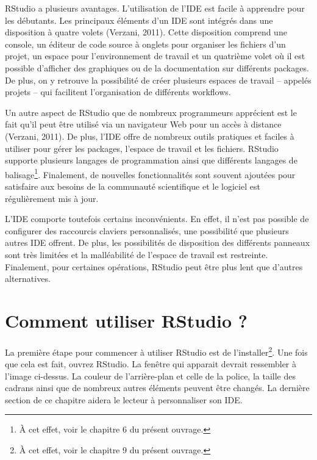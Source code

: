 \documentclass[
  letterpaper,
]{scrbook}
\begin{document}
RStudio a plusieurs avantages. L'utilisation de l'IDE est facile à
apprendre pour les débutants. Les principaux éléments d'un IDE sont
intégrés dans une disposition à quatre volets (Verzani, 2011). Cette
disposition comprend une console, un éditeur de code source à onglets
pour organiser les fichiers d'un projet, un espace pour l'environnement
de travail et un quatrième volet où il est possible d'afficher des
graphiques ou de la documentation sur différents packages. De plus, on y
retrouve la possibilité de créer plusieurs espaces de travail -- appelés
projets -- qui facilitent l'organisation de différents workflows.

Un autre aspect de RStudio que de nombreux programmeurs apprécient est
le fait qu'il peut être utilisé via un navigateur Web pour un accès à
distance (Verzani, 2011). De plus, l'IDE offre de nombreux outils
pratiques et faciles à utiliser pour gérer les packages, l'espace de
travail et les fichiers. RStudio supporte plusieurs langages de
programmation ainsi que différents langages de balisage\footnote{À cet
  effet, voir le chapitre 6 du présent ouvrage.}. Finalement, de
nouvelles fonctionnalités sont souvent ajoutées pour satisfaire aux
besoins de la communauté scientifique et le logiciel est régulièrement
mis à jour.

L'IDE comporte toutefois certains inconvénients. En effet, il n'est pas
possible de configurer des raccourcis claviers personnalisés, une
possibilité que plusieurs autres IDE offrent. De plus, les possibilités
de disposition des différents panneaux sont très limitées et la
malléabilité de l'espace de travail est restreinte. Finalement, pour
certaines opérations, RStudio peut être plus lent que d'autres
alternatives.

\hypertarget{comment-utiliser-rstudio}{%
\section{Comment utiliser RStudio ?}\label{comment-utiliser-rstudio}}

La première étape pour commencer à utiliser RStudio est de
l'installer\footnote{À cet effet, voir le chapitre 9 du présent ouvrage.}.
Une fois que cela est fait, ouvrez RStudio. La fenêtre qui apparait
devrait ressembler à l'image ci-dessus. La couleur de l'arrière-plan et
celle de la police, la taille des cadrans ainsi que de nombreux autres
éléments peuvent être changés. La dernière section de ce chapitre aidera
le lecteur à personnaliser son IDE.
\end{document}
